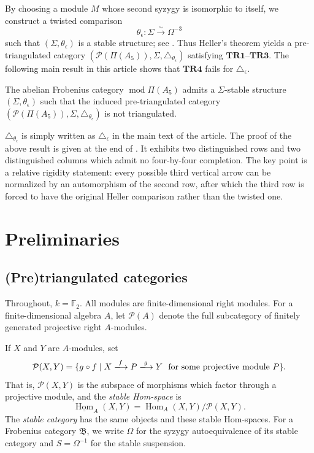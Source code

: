 \documentclass[a4paper,reqno,10pt]{amsart}
\numberwithin{equation}{section}
\DeclareMathOperator{\modu}{mod}
\DeclareMathOperator{\Hom}{Hom}
\newcommand{\eps}{\epsilon}
\newcommand{\ol}[1]{\underline{#1}}
\begin{document}
By choosing a module $M$ whose second syzygy is isomorphic
to itself, we construct a twisted comparison
$$\theta_\eps:\Sigma\xrightarrow{\sim}\Omega^{-3}$$ 
such that $(\Sigma, \theta_\epsilon)$ is a stable structure; see .
Thus Heller's theorem \cite[Theorem 16.4]{Heller1968} yields a pre-triangulated category
$(\mathcal P(\Pi(A_5)), \Sigma, \triangle_{\theta_\eps})$ satisfying $\mathbf{TR1}$--$\mathbf{TR3}$. The following main result in this article shows that
$\mathbf{TR4}$ fails for $\triangle_\eps$.

\begin{theorem}\label{thm:main}
The abelian Frobenius category $\modu \Pi(A_5)$ admits a $\Sigma$-stable structure $(\Sigma, \theta_\eps)$ such that the induced pre-triangulated category $(\mathcal P(\Pi(A_5)), \Sigma, \triangle_{\theta_\eps})$ is not triangulated. 
\end{theorem}

$\triangle_{\theta_{\eps}}$ is simply written as $\triangle_{\eps}$ in the main text of the article. The proof of the above result is given at the end of
. It exhibits two distinguished rows and two distinguished
columns which admit no four-by-four completion. The key point is a relative
rigidity statement: every possible third vertical arrow can be normalized by
an automorphism of the second row, after which the third row is forced to have
the original Heller comparison rather than the twisted one.


\section{Preliminaries}\label{sec:preliminaries}

\subsection{(Pre)triangulated categories}\label{sec:heller}

Throughout, $k=\mathbb F_2$. All modules are finite-dimensional right modules.
For a finite-dimensional algebra $A$, let $\mathcal P(A)$ denote the full
subcategory of finitely generated projective right $A$-modules.

\begin{definition}\label{def:stable-category}
If $X$ and $Y$ are $A$-modules, set
\[
 \mathcal P(X,Y)=
 \{g\circ f\mid
 X\xlongrightarrow{f}P\xlongrightarrow{g}Y
 \ \text{ for some projective module } P\}.
\]
That is, $\mathcal P(X,Y)$ is the subspace of morphisms which factor through a
projective module, and the \emph{stable Hom-space} is
\[
 \ol{\Hom}_A(X,Y)
 =\Hom_A(X,Y)/\mathcal P(X,Y).
\]
The \emph{stable category} has the same objects and these stable Hom-spaces. For a Frobenius category $\mathfrak B$,
we write $\Omega$ for the syzygy autoequivalence of its stable category and
$S=\Omega^{-1}$ for the stable suspension.
\end{definition}
\end{document}
